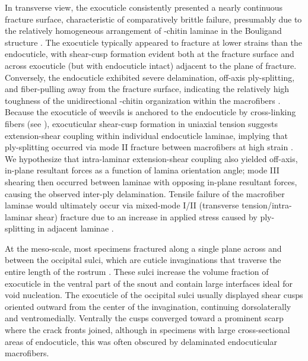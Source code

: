 \documentclass[twocolumn, linenumbers, superscriptaddress, nofootinbib]{revtex4-1}
\begin{document}
		In transverse view, the exocuticle consistently presented a nearly continuous fracture surface, characteristic of comparatively brittle failure, presumably due to the relatively homogeneous arrangement of \textalpha-chitin laminae in the Bouligand structure \cite{Nikolov2010, Nikolov2011}.
		The exocuticle typically appeared to fracture at lower strains than the endocuticle, with shear-cusp formation evident both at the fracture surface and across exocuticle (but with endocuticle intact) adjacent to the plane of fracture.
		Conversely, the endocuticle exhibited severe delamination, off-axis ply-splitting, and fiber-pulling away from the fracture surface, indicating the relatively high toughness of the unidirectional \textalpha-chitin organization within the macrofibers \cite{Kamp2010, Kamp2015}.
		Because the exocuticle of weevils is anchored to the endocuticle by cross-linking fibers (see \cite{Kamp2015, Longhai2017}), exocuticular shear-cusp formation in uniaxial tension suggests extension-shear coupling within individual endocuticle laminae, implying that ply-splitting occurred via mode II fracture between macrofibers at high strain \cite{Jones2014, Reddy2004}.
		We hypothesize that intra-laminar extension-shear coupling also yielded off-axis, in-plane resultant forces as a function of lamina orientation angle; mode III shearing then occurred between laminae with opposing in-plane resultant forces, causing the observed inter-ply delamination.
		Tensile failure of the macrofiber laminae would ultimately occur via mixed-mode I/II (transverse tension/intra-laminar shear) fracture due to an increase in applied stress caused by ply-splitting in adjacent laminae \cite{Greenhalgh2009}.
		
		At the meso-scale, most specimens fractured along a single plane across and between the occipital sulci, which are cuticle invaginations that traverse the entire length of the rostrum \cite{Davis2014, Dennell1942}.
		These sulci increase the volume fraction of exocuticle in the ventral part of the snout and contain large interfaces ideal for void nucleation.
		The exocuticle of the occipital sulci usually displayed shear cusps oriented outward from the center of the invagination, continuing dorsolaterally and ventromedially.
		Ventrally the cusps converged toward a prominent scarp where the crack fronts joined, although in specimens with large cross-sectional areas of endocuticle, this was often obscured by delaminated endocuticular macrofibers.
		
\end{document}
